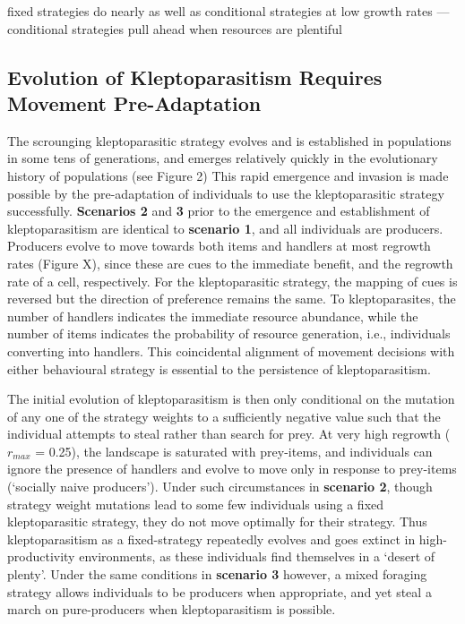 \documentclass[11pt]{article}
\begin{document}
fixed strategies do nearly as well as conditional strategies at low growth rates --- conditional strategies pull ahead when resources are plentiful

\subsection{Evolution of Kleptoparasitism Requires Movement Pre-Adaptation}

The scrounging kleptoparasitic strategy evolves and is established in populations in some tens of generations, and emerges relatively quickly in the evolutionary history of populations (see Figure 2)
This rapid emergence and invasion is made possible by the pre-adaptation of individuals to use the kleptoparasitic strategy successfully.
\textbf{Scenarios 2} and \textbf{3} prior to the emergence and establishment of kleptoparasitism are identical to \textbf{scenario 1}, and all individuals are producers.
Producers evolve to move towards both items and handlers at most regrowth rates (Figure X), since these are cues to the immediate benefit, and the regrowth rate of a cell, respectively.
For the kleptoparasitic strategy, the mapping of cues is reversed but the direction of preference remains the same.
To kleptoparasites, the number of handlers indicates the immediate resource abundance, while the number of items indicates the probability of resource generation, i.e., individuals converting into handlers.
This coincidental alignment of movement decisions with either behavioural strategy is essential to the persistence of kleptoparasitism.

The initial evolution of kleptoparasitism is then only conditional on the mutation of any one of the strategy weights to a sufficiently negative value such that the individual attempts to steal rather than search for prey.
At very high regrowth ($r_{max}$ = 0.25), the landscape is saturated with prey-items, and individuals can ignore the presence of handlers and evolve to move only in response to prey-items (`socially naive producers').
Under such circumstances in \textbf{scenario 2}, though strategy weight mutations lead to some few individuals using a fixed kleptoparasitic strategy, they do not move optimally for their strategy.
Thus kleptoparasitism as a fixed-strategy repeatedly evolves and goes extinct in high-productivity environments, as these individuals find themselves in a `desert of plenty'.
Under the same conditions in \textbf{scenario 3} however, a mixed foraging strategy allows individuals to be producers when appropriate, and yet steal a march on pure-producers when kleptoparasitism is possible.
\end{document}
